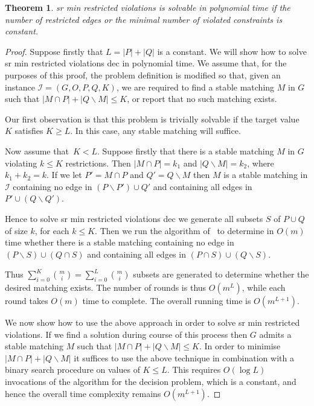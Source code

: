 \documentclass[preprint,12pt]{elsarticle}
\newtheorem{theorem}{Theorem}[section]
\begin{document}
\begin{theorem}
\label{srminrestconst}
	{\sc sr min restricted violations} is solvable in polynomial time if the number of restricted edges or the minimal number of violated constraints is constant.
\end{theorem}

\begin{proof}
Suppose firstly that $L=|P|+|Q|$ is a constant.  We will show how to solve {\sc sr min restricted violations dec} in polynomial time.  We assume that, for the purposes of this proof, the problem definition is modified so that, given an instance $\mathcal{I} = (G, O, P, Q, K)$, we are required to find a stable matching $M$ in $G$ such that $|M\cap P|+|Q\backslash M|\leq K$, or report that no such matching exists.

Our first observation is that this problem is trivially solvable if the target value $K$ satisfies $K \geq L$.  In this case, any stable matching will suffice.

Now assume that~$K<L$.  Suppose firstly that there is a stable matching $M$ in $G$ violating $k\leq K$ restrictions.  Then $|M\cap P|=k_1$ and $|Q\backslash M|=k_2$, where $k_1+k_2=k$.  If we let $P'=M\cap P$ and $Q'=Q\backslash M$ then $M$ is a stable matching in $\mathcal I$ containing no edge in $(P\backslash P')\cup Q'$ and containing all edges in $P'\cup (Q\backslash Q')$.

Hence to solve {\sc sr min restricted violations dec} we generate all subsets $S$ of $P\cup Q$ of size $k$, for each $k\leq K$.  Then we run the algorithm of~\cite{FIM07} to determine in $O(m)$ time whether there is a stable matching containing no edge in $(P\backslash S)\cup (Q\cap S)$ and containing all edges in $(P\cap S)\cup (Q\backslash S)$.  

Thus $\sum_{i = 0}^{K}{m \choose i}=\sum_{i = 0}^{L}{m \choose i}$ subsets are generated to determine whether the desired matching exists.  The number of rounds is thus $O(m^L)$, while each round takes $O(m)$ time to complete.  The overall running time is $O(m^{L+1})$.

We now show how to use the above approach in order to solve {\sc sr min restricted violations}.  If we find a solution during course of this process then $G$ admits a stable matching $M$ such that $|M\cap P|+|Q\backslash M|\leq K$.  In order to minimise $|M\cap P|+|Q\backslash M|$ it suffices to use the above technique in combination with a binary search procedure on values of $K\leq L$.  This requires $O(\log L)$ invocations of the algorithm for the decision problem, which is a constant, and hence the overall time complexity remains $O(m^{L+1})$.
\medskip


\end{proof}
\end{document}

